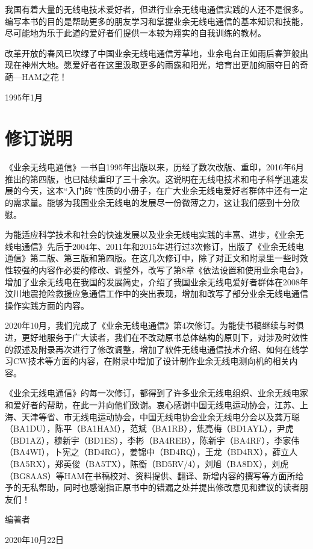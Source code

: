\documentclass[12pt,UTF8]{ctexbook}
\begin{document}
我国有着大量的无线电技术爱好者，但进行业余无线电通信实践的人还不是很多。编写本书的目的是帮助更多的朋友学习和掌握业余无线电通信的基本知识和技能，尽可能地为乐于此道的爱好者们提供一本较为翔实的自我训练的教材。

改革开放的春风已吹绿了中国业余无线电通信芳草地，业余电台正如雨后春笋般出现在神州大地。愿爱好者在这里汲取更多的雨露和阳光，培育出更加绚丽夺目的奇葩—HAM之花！

1995年1月

\chapter{修订说明}

《业余无线电通信》一书自1995年出版以来，历经了数次改版、重印，2016年6月推出的第四版，也已陆续重印了三十余次。这说明在无线电技术和电子科学迅速发展的今天，这本“入门砖”性质的小册子，在广大业余无线电爱好者群体中还有一定的需求量。能够为我国业余无线电的发展尽一份微薄之力，这让我们感到十分欣慰。

为能适应科学技术和社会的快速发展以及业余无线电实践的丰富、进步，《业余无线电通信》先后于2004年、2011年和2015年进行过3次修订，出版了《业余无线电通信》第二版、第三版和第四版。在这几次修订中，除了对正文和附录里一些时效性较强的内容作必要的修改、调整外，改写了第8章《依法设置和使用业余电台》，增加了业余无线电在我国的发展简史，介绍了我国业余无线电爱好者群体在2008年汶川地震抢险救援应急通信工作中的突出表现，增加和改写了部分业余无线电通信操作实践方面的内容。

2020年10月，我们完成了《业余无线电通信》第4次修订。为能使书稿继续与时俱进，更好地服务于广大读者，我们在不改动原书总体结构的原则下，对涉及时效性的叙述及附录再次进行了修改调整，增加了软件无线电通信技术介绍、如何在线学习CW技术等方面的内容，在附录中增加了设计制作业余无线电测向机的相关内容。

《业余无线电通信》的每一次修订，都得到了许多业余无线电组织、业余无线电家和爱好者的帮助，在此一并向他们致谢。衷心感谢中国无线电运动协会，江苏、上海、天津等省、市无线电运动协会，中国无线电协会业余无线电分会以及龚万聪（BA1DU），陈平（BA1HAM），范斌（BA1RB），焦亮梅（BD1AYL），尹虎（BD1AZ），穆新宇（BD1ES），李彬（BA4REB），陈新宇（BA4RF），李家伟（BA4WI），卜宪之（BD4RG），姜锦中（BD4RQ），王龙（BD4RX），薛立人（BA5RX），郑英俊（BA5TX），陈衡（BD5RV/4），刘旭（BA8DX），刘虎（BG8AAS）等HAM在书稿校对、资料提供、翻译、新增内容的撰写等方面所给予的无私帮助，同时也感谢指正原书中的错漏之处并提出修改意见和建议的读者朋友们！

编著者

2020年10月22日
\end{document}
